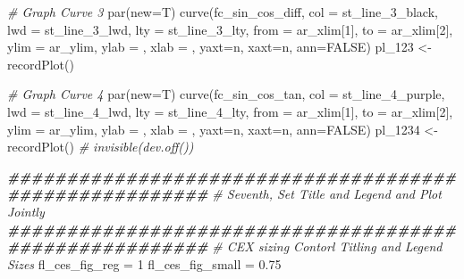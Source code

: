\documentclass[
]{book}
\newenvironment{Shaded}{\begin{snugshade}}{\end{snugshade}}
\newcommand{\AttributeTok}[1]{\textcolor[rgb]{0.77,0.63,0.00}{#1}}
\newcommand{\CommentTok}[1]{\textcolor[rgb]{0.56,0.35,0.01}{\textit{#1}}}
\newcommand{\ConstantTok}[1]{\textcolor[rgb]{0.00,0.00,0.00}{#1}}
\newcommand{\DecValTok}[1]{\textcolor[rgb]{0.00,0.00,0.81}{#1}}
\newcommand{\DocumentationTok}[1]{\textcolor[rgb]{0.56,0.35,0.01}{\textbf{\textit{#1}}}}
\newcommand{\FloatTok}[1]{\textcolor[rgb]{0.00,0.00,0.81}{#1}}
\newcommand{\FunctionTok}[1]{\textcolor[rgb]{0.00,0.00,0.00}{#1}}
\newcommand{\NormalTok}[1]{#1}
\newcommand{\OtherTok}[1]{\textcolor[rgb]{0.56,0.35,0.01}{#1}}
\newcommand{\StringTok}[1]{\textcolor[rgb]{0.31,0.60,0.02}{#1}}
\begin{document}
\begin{Shaded}
\begin{Highlighting}[]
\CommentTok{\# Graph Curve 3}
\FunctionTok{par}\NormalTok{(}\AttributeTok{new=}\NormalTok{T)}
\FunctionTok{curve}\NormalTok{(fc\_sin\_cos\_diff,}
      \AttributeTok{col =}\NormalTok{ st\_line\_3\_black,}
      \AttributeTok{lwd =}\NormalTok{ st\_line\_3\_lwd, }\AttributeTok{lty =}\NormalTok{ st\_line\_3\_lty,}
      \AttributeTok{from =}\NormalTok{ ar\_xlim[}\DecValTok{1}\NormalTok{], }\AttributeTok{to =}\NormalTok{ ar\_xlim[}\DecValTok{2}\NormalTok{], }\AttributeTok{ylim =}\NormalTok{ ar\_ylim,}
      \AttributeTok{ylab =} \StringTok{\textquotesingle{}\textquotesingle{}}\NormalTok{, }\AttributeTok{xlab =} \StringTok{\textquotesingle{}\textquotesingle{}}\NormalTok{, }\AttributeTok{yaxt=}\StringTok{\textquotesingle{}n\textquotesingle{}}\NormalTok{, }\AttributeTok{xaxt=}\StringTok{\textquotesingle{}n\textquotesingle{}}\NormalTok{, }\AttributeTok{ann=}\ConstantTok{FALSE}\NormalTok{)}
\NormalTok{pl\_123 }\OtherTok{\textless{}{-}} \FunctionTok{recordPlot}\NormalTok{()}

\CommentTok{\# Graph Curve 4}
\FunctionTok{par}\NormalTok{(}\AttributeTok{new=}\NormalTok{T)}
\FunctionTok{curve}\NormalTok{(fc\_sin\_cos\_tan,}
      \AttributeTok{col =}\NormalTok{ st\_line\_4\_purple,}
      \AttributeTok{lwd =}\NormalTok{ st\_line\_4\_lwd, }\AttributeTok{lty =}\NormalTok{ st\_line\_4\_lty,}
      \AttributeTok{from =}\NormalTok{ ar\_xlim[}\DecValTok{1}\NormalTok{], }\AttributeTok{to =}\NormalTok{ ar\_xlim[}\DecValTok{2}\NormalTok{], }\AttributeTok{ylim =}\NormalTok{ ar\_ylim,}
      \AttributeTok{ylab =} \StringTok{\textquotesingle{}\textquotesingle{}}\NormalTok{, }\AttributeTok{xlab =} \StringTok{\textquotesingle{}\textquotesingle{}}\NormalTok{, }\AttributeTok{yaxt=}\StringTok{\textquotesingle{}n\textquotesingle{}}\NormalTok{, }\AttributeTok{xaxt=}\StringTok{\textquotesingle{}n\textquotesingle{}}\NormalTok{, }\AttributeTok{ann=}\ConstantTok{FALSE}\NormalTok{)}
\NormalTok{pl\_1234 }\OtherTok{\textless{}{-}} \FunctionTok{recordPlot}\NormalTok{()}
\CommentTok{\# invisible(dev.off())}

\DocumentationTok{\#\#\#\#\#\#\#\#\#\#\#\#\#\#\#\#\#\#\#\#\#\#\#\#\#\#\#\#\#\#\#\#\#\#\#\#\#\#\#\#\#\#\#\#\#\#\#\#\#\#\#\#\#\#\#}
\CommentTok{\# Seventh, Set Title and Legend and Plot Jointly}
\DocumentationTok{\#\#\#\#\#\#\#\#\#\#\#\#\#\#\#\#\#\#\#\#\#\#\#\#\#\#\#\#\#\#\#\#\#\#\#\#\#\#\#\#\#\#\#\#\#\#\#\#\#\#\#\#\#\#\#}
\CommentTok{\# CEX sizing Contorl Titling and Legend Sizes}
\NormalTok{fl\_ces\_fig\_reg }\OtherTok{=} \DecValTok{1}
\NormalTok{fl\_ces\_fig\_small }\OtherTok{=} \FloatTok{0.75}


\end{Highlighting}
\end{Shaded}
\end{document}

